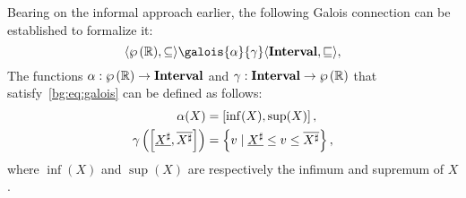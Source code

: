 Bearing on the informal approach earlier, the following Galois connection can
be established to formalize it:
\begin{equation}
    \lattice{\powersetof\realset}{\subseteq}
    \galois{\alpha}{\gamma}
    \lattice{\intervalset}{\sqsubseteq},
\end{equation}
The functions $\alpha: \wp\left({\mathbb{R}}\right) \to \mathbf{Interval}$ and $\gamma:
\mathbf{Interval} \to \wp\left({\mathbb{R}}\right)$ that satisfy~\eqref{bg:eq:galois} can be
defined as follows:
\begin{equation}
    \begin{aligned}
        \alpha(X) &= \left[{\inf(X)}, {\sup(X)}\right], \\
        \gamma\left(
            \left[{\underline{X^\sharp}}, {\overline{X^\sharp}}\right]
        \right) &= \left\{
            v \mid \underline{X^\sharp} \leq v \leq \overline{X^\sharp}
        \right\},
    \end{aligned}
\end{equation}
where $\inf(X)$ and $\sup(X)$ are respectively the infimum and supremum of $X$.

